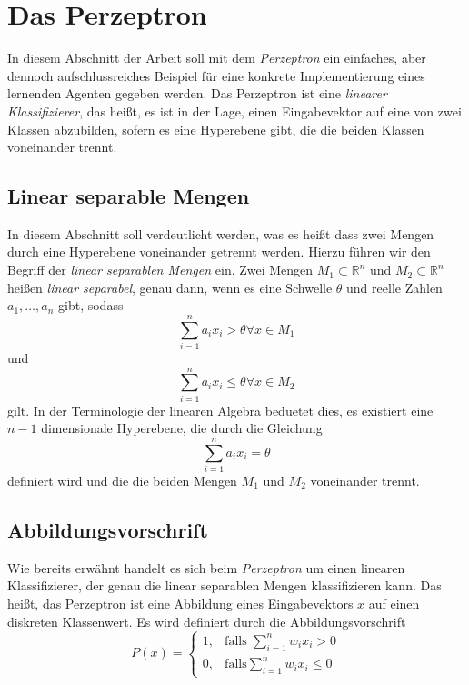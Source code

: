 \documentclass[fontsize=11pt]{scrartcl}
\begin{document}
        \section{Das Perzeptron}
            In diesem Abschnitt der Arbeit soll mit dem \emph{Perzeptron} ein einfaches, aber dennoch aufschlussreiches Beispiel für eine konkrete Implementierung eines lernenden Agenten gegeben werden.
            \newline
            Das Perzeptron ist eine \emph{linearer Klassifizierer}, das heißt, es ist in der Lage, einen Eingabevektor auf eine von zwei Klassen abzubilden, sofern es eine Hyperebene gibt, die die beiden Klassen voneinander trennt.

            \subsection{Linear separable Mengen}
                In diesem Abschnitt soll verdeutlicht werden, was es heißt dass zwei Mengen durch eine Hyperebene voneinander getrennt werden.
                Hierzu führen wir den Begriff der 
                \emph{linear separablen Mengen} ein.
                \newline
                Zwei Mengen $M_1 \subset \mathbb{R}^n$ und $M_2 \subset \mathbb{R}^n$ heißen \emph{linear separabel}, genau dann, wenn es eine Schwelle $\theta$ und reelle Zahlen $a_1,\dots,a_n$ gibt, sodass
                $$
                    \sum_{i=1}^n a_ix_i > \theta \forall x \in M_1$$
                und
                $$\sum_{i=1}^n a_ix_i \leq \theta \forall x \in M_2$$
                gilt.
                \newline
                In der Terminologie der linearen Algebra beduetet dies, es existiert eine $n-1$ dimensionale Hyperebene, die durch die Gleichung
                $$
                    \sum_{i=1}^n a_ix_i = \theta
                $$
                definiert wird und die die beiden Mengen $M_1$ und $M_2$ voneinander trennt.

            \subsection{Abbildungsvorschrift}
                Wie bereits erwähnt handelt es sich beim \emph{Perzeptron} um einen linearen Klassifizierer, der genau die linear separablen Mengen klassifizieren kann. Das heißt, das Perzeptron ist eine Abbildung eines Eingabevektors $x$ auf einen diskreten Klassenwert. Es wird definiert durch die Abbildungsvorschrift
                $$
            P(x)=\left\{\begin{array}{cl} 1, & \mbox{falls }\sum_{i=1}^nw_ix_i > 0\\ 0, & \mbox{falls} \sum_{i=1}^n w_ix_i \leq 0 \end{array}\right. 
                $$
\end{document}
